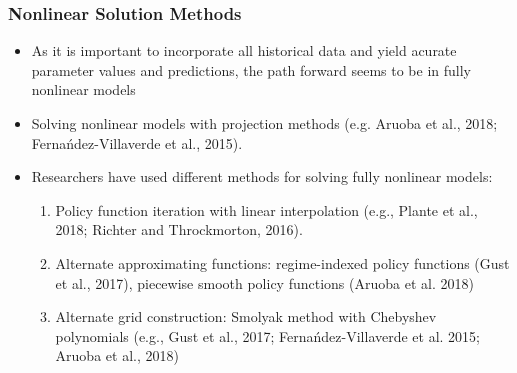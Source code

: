 \documentclass[11pt]{beamer}
\begin{document}
\begin{frame}\frametitle{Nonlinear Solution Methods}
\begin{itemize}\setlength{\itemsep}{10pt}
	\item  <1-|handout:1>As it is important to incorporate all historical data and yield acurate parameter values and predictions, the path forward seems to be in fully nonlinear models
	\item <2-|handout:1>Solving nonlinear models with projection methods (e.g. Aruoba et al., 2018; Ferna\'ndez-Villaverde et al., 2015).
	\item  <3-|handout:1>Researchers have used different methods for solving fully nonlinear models:
	\begin{enumerate} \setlength{\itemsep}{4pt}
		\item  Policy function iteration with linear interpolation (e.g., Plante et al., 2018; Richter and Throckmorton, 2016).
		\item  Alternate approximating functions: regime-indexed policy functions (Gust et al., 2017), piecewise smooth policy functions (Aruoba et al. 2018)
		\item  Alternate grid construction: Smolyak method with Chebyshev polynomials (e.g., Gust et al., 2017; Ferna\'ndez-Villaverde et al. 2015; Aruoba et al., 2018)
	\end{enumerate}
\end{itemize}
\end{frame}
\end{document}
